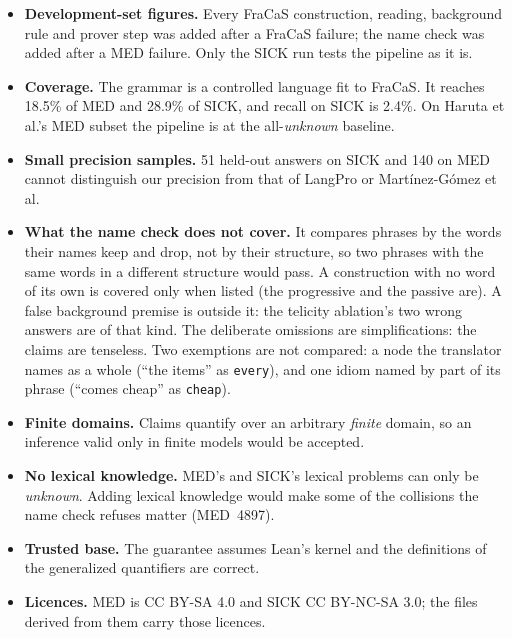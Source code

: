 \documentclass[11pt]{article}
\newcommand{\unk}{\textit{unknown}}
\newcommand{\nm}[1]{\texttt{#1}}
\begin{document}
\begin{itemize}
\item \textbf{Development-set figures.} Every FraCaS construction,
reading, background rule and prover step was added after a FraCaS
failure; the name check was added after a MED failure. Only the SICK
run tests the pipeline as it is.
\item \textbf{Coverage.} The grammar is a controlled language fit to
FraCaS. It reaches 18.5\% of MED and 28.9\% of SICK, and recall on SICK
is 2.4\%. On Haruta et al.'s MED subset the pipeline is at the
all-\unk{} baseline.
\item \textbf{Small precision samples.} 51 held-out answers on SICK and
140 on MED cannot distinguish our precision from that of LangPro or
Mart\'inez-G\'omez et al.
\item \textbf{What the name check does not cover.} It compares phrases by
the words their names keep and drop, not by their structure, so two
phrases with the same words in a different structure would pass. A
construction with no word of its own is covered only when listed (the
progressive and the passive are). A false background premise is outside
it: the telicity ablation's two wrong answers are of that kind. The
deliberate omissions are simplifications: the claims are tenseless.
Two exemptions are not compared: a node the translator names as a whole
(``the items'' as \nm{every}), and one idiom named by part of its
phrase (``comes cheap'' as \nm{cheap}).
\item \textbf{Finite domains.} Claims quantify over an arbitrary
\emph{finite} domain, so an inference valid only in finite models would
be accepted.
\item \textbf{No lexical knowledge.} MED's and SICK's lexical problems
can only be \unk{}. Adding lexical knowledge would make some of the
collisions the name check refuses matter (MED~4897).
\item \textbf{Trusted base.} The guarantee assumes Lean's kernel and the
definitions of the generalized quantifiers are correct.
\item \textbf{Licences.} MED is CC BY-SA 4.0 and SICK CC BY-NC-SA 3.0;
the files derived from them carry those licences.
\end{itemize}


\end{document}
